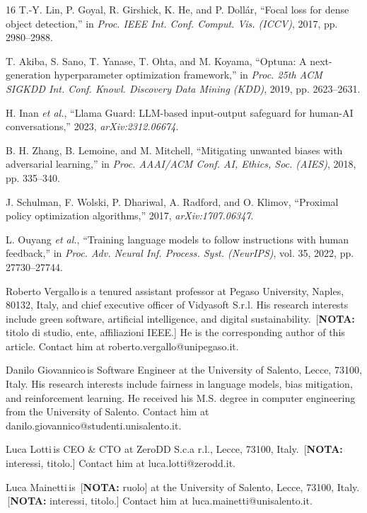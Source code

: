 \documentclass{IEEEcsmag}
\newif\ifshownotes \shownotestrue
\newcommand{\nota}[1]{\ifshownotes{\color{red}\,[\textbf{NOTA:} #1]}\fi}
\begin{document}
\begin{thebibliography}{16}
T.-Y. Lin, P. Goyal, R. Girshick, K. He, and P. Doll\'ar, ``Focal loss for dense object detection,'' in {\it Proc. IEEE Int. Conf. Comput. Vis. (ICCV)}, 2017, pp. 2980--2988.

T. Akiba, S. Sano, T. Yanase, T. Ohta, and M. Koyama, ``Optuna: A next-generation hyperparameter optimization framework,'' in {\it Proc. 25th ACM SIGKDD Int. Conf. Knowl. Discovery Data Mining (KDD)}, 2019, pp. 2623--2631.

H. Inan {\it et al.}, ``Llama Guard: LLM-based input-output safeguard for human-AI conversations,'' 2023, {\it arXiv:2312.06674}.

B. H. Zhang, B. Lemoine, and M. Mitchell, ``Mitigating unwanted biases with adversarial learning,'' in {\it Proc. AAAI/ACM Conf. AI, Ethics, Soc. (AIES)}, 2018, pp. 335--340.

J. Schulman, F. Wolski, P. Dhariwal, A. Radford, and O. Klimov, ``Proximal policy optimization algorithms,'' 2017, {\it arXiv:1707.06347}.

L. Ouyang {\it et al.}, ``Training language models to follow instructions with human feedback,'' in {\it Proc. Adv. Neural Inf. Process. Syst. (NeurIPS)}, vol. 35, 2022, pp. 27730--27744.

\end{thebibliography}\vspace*{-8pt}

\begin{IEEEbiography}{Roberto Vergallo}{\,}is a tenured assistant professor at Pegaso University, Naples, 80132, Italy, and chief executive officer of Vidyasoft S.r.l. His research interests include green software, artificial intelligence, and digital sustainability. \nota{titolo di studio, ente, affiliazioni IEEE.} He is the corresponding author of this article. Contact him at roberto.vergallo@unipegaso.it.
\end{IEEEbiography}

\begin{IEEEbiography}{Danilo Giovannico}{\,}is Software Engineer at the University of Salento, Lecce, 73100, Italy. His research interests include fairness in language models, bias mitigation, and reinforcement learning. He received his M.S. degree in computer engineering from the University of Salento. Contact him at danilo.giovannico@studenti.unisalento.it.
\end{IEEEbiography}

\begin{IEEEbiography}{Luca Lotti}{\,}is CEO \& CTO at ZeroDD S.c.a r.l., Lecce, 73100, Italy. \nota{interessi, titolo.} Contact him at luca.lotti@zerodd.it.
\end{IEEEbiography}

\begin{IEEEbiography}{Luca Mainetti}{\,}is \nota{ruolo} at the University of Salento, Lecce, 73100, Italy. \nota{interessi, titolo.} Contact him at luca.mainetti@unisalento.it.
\end{IEEEbiography}
\end{document}
